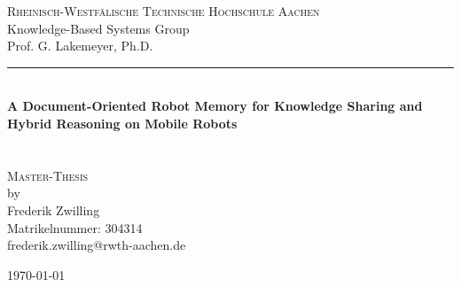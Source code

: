 \begin{titlepage}
  
  \begin{center}
    
    \Large
    \textsc{Rheinisch-Westfälische Technische Hochschule Aachen}\\
    Knowledge-Based Systems Group\\
    Prof. G. Lakemeyer, Ph.D.\\
    
    \vspace{4cm}
    

    \hrule \\
    [0.4cm]
           {
             \Huge 
             \bfseries
             A Document-Oriented Robot Memory for Knowledge Sharing and Hybrid Reasoning on Mobile Robots\\
           }\\
   [0.4cm]
   \hline \\
   [1.5cm]
   
    \textsc{Master-Thesis}\\
    by\\ 
    [0.4cm]
    \large Frederik Zwilling\\
    \normalsize
    Matrikelnummer: 304314\\
    frederik.zwilling@rwth-aachen.de\\

    \vspace{8cm}
    
    \today
  \end{center}

\end{titlepage}
